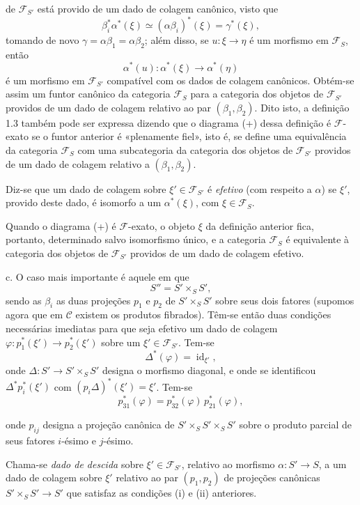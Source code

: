 de $\mathcal F_{S'}$ está provido de um dado de colagem canônico, visto que
\[
  \beta_i^*\alpha^*(\xi)\simeq(\alpha\beta_i)^*(\xi)=\gamma^*(\xi),
\]
tomando de novo $\gamma=\alpha\beta_1=\alpha\beta_2$; além disso, se
$u:\xi\longrightarrow\eta$ é um morfismo em $\mathcal F_S$, então
\[
  \alpha^*(u):\alpha^*(\xi)\longrightarrow\alpha^*(\eta)
\]
é um morfismo em $\mathcal F_{S'}$ compatível com os dados de colagem
canônicos. Obtém-se assim um funtor canônico da categoria $\mathcal F_S$ para
a categoria dos objetos de $\mathcal F_{S'}$ providos de um dado de colagem
relativo ao par $(\beta_1,\beta_2)$. Dito isto, a definição 1.3 também
pode ser expressa dizendo que o diagrama (+) dessa definição é
$\mathcal F$-exato se o funtor anterior é «plenamente fiel», isto é, se
define uma equivalência da categoria $\mathcal F_S$ com uma subcategoria da
categoria dos objetos de $\mathcal F_{S'}$ providos de um dado de colagem
relativo a $(\beta_1,\beta_2)$.

 Diz-se que um dado de colagem sobre
$\xi'\in\mathcal F_{S'}$ é \emph{efetivo} (com respeito a $\alpha$) se
$\xi'$, provido deste dado, é isomorfo a um $\alpha^*(\xi)$, com
$\xi\in\mathcal F_S$.

Quando o diagrama (+) é $\mathcal F$-exato, o objeto $\xi$ da definição
anterior fica, portanto, determinado salvo isomorfismo único, e a categoria
$\mathcal F_S$ é equivalente à categoria dos objetos de
$\mathcal F_{S'}$ providos de um dado de colagem efetivo.

\medskip\noindent
c. O caso mais importante é aquele em que
\[
  S''=S'\times_S S',
\]
sendo as $\beta_i$ as duas projeções $p_1$ e $p_2$ de
$S'\times_S S'$ sobre seus dois fatores (supomos agora que em
$\mathcal C$ existem os produtos fibrados). Têm-se então duas
condições necessárias imediatas para que seja efetivo um dado de colagem
$\varphi:p_1^*(\xi')\longrightarrow p_2^*(\xi')$ sobre um
$\xi'\in\mathcal F_{S'}$. Tem-se
\[
  \tag{i}
  \Delta^*(\varphi)=\operatorname{id}_{\xi'},
\]
onde $\Delta:S'\longrightarrow S'\times_S S'$ designa o morfismo diagonal,
e onde se identificou $\Delta^*p_i^*(\xi')$ com
$(p_i\Delta)^*(\xi')=\xi'$. Tem-se
\[
  \tag{ii}
  p_{31}^*(\varphi)=p_{32}^*(\varphi)\,p_{21}^*(\varphi),
\]

onde $p_{ij}$ designa a projeção canônica de
$S'\times_S S'\times_S S'$ sobre o produto parcial de seus fatores
$i$-ésimo e $j$-ésimo.

 Chama-se \emph{dado de descida} sobre
$\xi'\in\mathcal F_{S'}$, relativo ao morfismo
$\alpha:S'\longrightarrow S$, a um dado de colagem sobre $\xi'$ relativo ao par
$(p_1,p_2)$ de projeções canônicas
$S'\times_S S'\longrightarrow S'$ que satisfaz as condições (i) e (ii)
anteriores.

